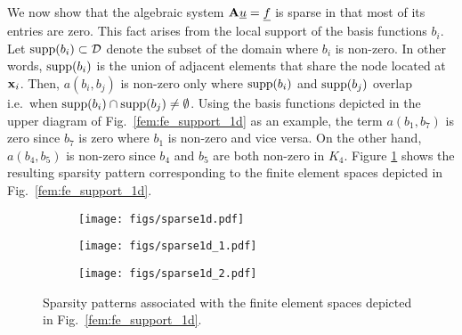 \documentclass[../doc.tex]{subfiles}
\begin{document}
We now show that the algebraic system $\boldsymbol{\mathrm{A}}\underline{u} = \underline{f}$ is sparse in that most of its entries are zero. This fact arises from the local support of the basis functions $b_i$. Let $\operatorname{supp}(b_i) \subset \mathcal{D}$ denote the subset of the domain where $b_i$ is non-zero. In other words, $\operatorname{supp}(b_i)$ is the union of adjacent elements that share the node located at $\boldsymbol{\mathrm{x}}_i$. Then, $a(b_i, b_j)$ is non-zero only where $\operatorname{supp}(b_i)$ and $\operatorname{supp}(b_j)$ overlap i.e.~when $\operatorname{supp}(b_i) \cap \operatorname{supp}(b_j) \neq \emptyset$. Using the basis functions depicted in the upper diagram of Fig.~\ref{fem:fe_support_1d} as an example, the term $a(b_1,b_7)$ is zero since $b_7$ is zero where $b_1$ is non-zero and vice versa. On the other hand, $a(b_4,b_5)$ is non-zero since $b_4$ and $b_5$ are both non-zero in $K_4$. Figure \ref{fem:sparse1d} shows the resulting sparsity pattern corresponding to the finite element spaces depicted in Fig.~\ref{fem:fe_support_1d}. 
\begin{figure}
\centering
\begin{subfigure}{.32\textwidth}
	\centering
	\texttt{[image: figs/sparse1d.pdf]}
	\caption{}
\end{subfigure}
\begin{subfigure}{.32\textwidth}
	\centering
	\texttt{[image: figs/sparse1d\_1.pdf]}
	\caption{}
\end{subfigure}
\begin{subfigure}{.32\textwidth}
	\centering
	\texttt{[image: figs/sparse1d\_2.pdf]}
	\caption{}
\end{subfigure}
\caption{Sparsity patterns associated with the finite element spaces depicted in Fig.~\ref{fem:fe_support_1d}. }
\label{fem:sparse1d}
\end{figure}

\subsection{}

\section{}
\end{document}
